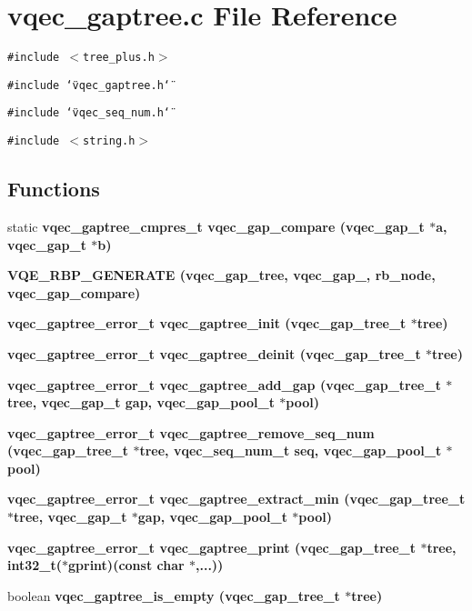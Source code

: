 \section{vqec\_\-gaptree.c File Reference}
\label{vqec__gaptree_8c}
{\tt \#include $<$tree\_\-plus.h$>$}\par
{\tt \#include \char`\"{}vqec\_\-gaptree.h\char`\"{}}\par
{\tt \#include \char`\"{}vqec\_\-seq\_\-num.h\char`\"{}}\par
{\tt \#include $<$string.h$>$}\par
\subsection*{Functions}
\begin{CompactItemize}
\item 
static \bf{vqec\_\-gaptree\_\-cmpres\_\-t} \bf{vqec\_\-gap\_\-compare} (\bf{vqec\_\-gap\_\-t} $\ast$a, \bf{vqec\_\-gap\_\-t} $\ast$b)
\item 
\bf{VQE\_\-RBP\_\-GENERATE} (vqec\_\-gap\_\-tree, \bf{vqec\_\-gap\_\-}, rb\_\-node, vqec\_\-gap\_\-compare)
\item 
\bf{vqec\_\-gaptree\_\-error\_\-t} \bf{vqec\_\-gaptree\_\-init} (\bf{vqec\_\-gap\_\-tree\_\-t} $\ast$tree)
\item 
\bf{vqec\_\-gaptree\_\-error\_\-t} \bf{vqec\_\-gaptree\_\-deinit} (\bf{vqec\_\-gap\_\-tree\_\-t} $\ast$tree)
\item 
\bf{vqec\_\-gaptree\_\-error\_\-t} \bf{vqec\_\-gaptree\_\-add\_\-gap} (\bf{vqec\_\-gap\_\-tree\_\-t} $\ast$tree, \bf{vqec\_\-gap\_\-t} gap, \bf{vqec\_\-gap\_\-pool\_\-t} $\ast$pool)
\item 
\bf{vqec\_\-gaptree\_\-error\_\-t} \bf{vqec\_\-gaptree\_\-remove\_\-seq\_\-num} (\bf{vqec\_\-gap\_\-tree\_\-t} $\ast$tree, vqec\_\-seq\_\-num\_\-t seq, \bf{vqec\_\-gap\_\-pool\_\-t} $\ast$pool)
\item 
\bf{vqec\_\-gaptree\_\-error\_\-t} \bf{vqec\_\-gaptree\_\-extract\_\-min} (\bf{vqec\_\-gap\_\-tree\_\-t} $\ast$tree, \bf{vqec\_\-gap\_\-t} $\ast$gap, \bf{vqec\_\-gap\_\-pool\_\-t} $\ast$pool)
\item 
\bf{vqec\_\-gaptree\_\-error\_\-t} \bf{vqec\_\-gaptree\_\-print} (\bf{vqec\_\-gap\_\-tree\_\-t} $\ast$tree, int32\_\-t($\ast$gprint)(const char $\ast$,...))
\item 
boolean \bf{vqec\_\-gaptree\_\-is\_\-empty} (\bf{vqec\_\-gap\_\-tree\_\-t} $\ast$tree)
\end{CompactItemize}


